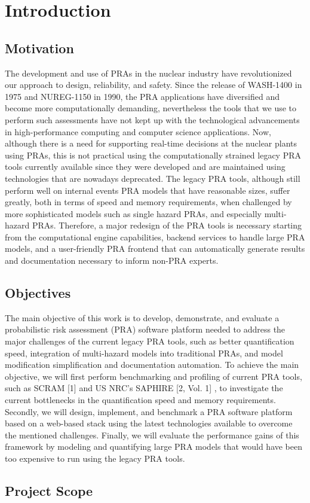 \chapter{Introduction}

\section{Motivation}
The development and use of PRAs in the nuclear industry have revolutionized our approach to design, reliability, and safety. Since the release of WASH-1400 in 1975 and NUREG-1150 in 1990, the PRA applications have diversified and become more computationally demanding, nevertheless the tools that we use to perform such assessments have not kept up with the technological advancements in
high-performance computing and computer science applications. Now, although there is a need for supporting real-time decisions at the nuclear plants using PRAs, this is not practical using the computationally strained legacy PRA tools currently available since they were developed and are maintained using technologies that are nowadays deprecated. The legacy PRA tools, although still perform well on internal events PRA models that have reasonable sizes, suffer greatly, both in terms of speed and memory requirements, when challenged by more sophisticated models such as single hazard
PRAs, and especially multi-hazard PRAs. Therefore, a major redesign of the PRA tools is necessary starting from the computational engine capabilities, backend services to handle large PRA models, and a
user-friendly PRA frontend that can automatically generate results and documentation necessary to inform non-PRA experts.

\section{Objectives}
The main objective of this work is to develop, demonstrate, and evaluate a probabilistic risk assessment (PRA) software platform needed to address the major challenges of the current legacy PRA
tools, such as better quantification speed, integration of multi-hazard models into traditional PRAs, and model modification simplification and documentation automation. To achieve the main objective, we will first perform benchmarking and profiling of current PRA tools, such as SCRAM [1] and US NRC’s SAPHIRE [2, Vol. 1] , to investigate the current bottlenecks in the quantification speed and memory requirements. Secondly, we will design, implement, and benchmark a PRA software platform based on a web-based stack using the latest technologies available to overcome the mentioned challenges. Finally, we will evaluate the performance gains of this framework by modeling and quantifying large PRA models that would have been too expensive to run using the legacy PRA tools.
\section{Project Scope}




